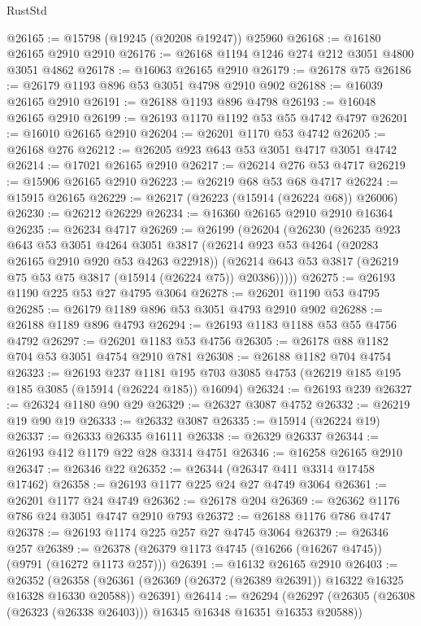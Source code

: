 \begin{lexlean}{RustStd}
\begin{coremodule}
@26165 := @15798 (@19245 (@20208 @19247)) @25960
@26168 := @16180 @26165 @2910 @2910
@26176 := @26168 @1194 @1246 @274 @212 @3051 @4800 @3051 @4862
@26178 := @16063 @26165 @2910
@26179 := @26178 @75
@26186 := @26179 @1193 @896 @53 @3051 @4798 @2910 @902
@26188 := @16039 @26165 @2910
@26191 := @26188 @1193 @896 @4798
@26193 := @16048 @26165 @2910
@26199 := @26193 @1170 @1192 @53 @55 @4742 @4797
@26201 := @16010 @26165 @2910
@26204 := @26201 @1170 @53 @4742
@26205 := @26168 @276
@26212 := @26205 @923 @643 @53 @3051 @4717 @3051 @4742
@26214 := @17021 @26165 @2910
@26217 := @26214 @276 @53 @4717
@26219 := @15906 @26165 @2910
@26223 := @26219 @68 @53 @68 @4717
@26224 := @15915 @26165
@26229 := @26217 (@26223 (@15914 (@26224 @68)) @26006)
@26230 := @26212 @26229
@26234 := @16360 @26165 @2910 @2910 @16364
@26235 := @26234 @4717
@26269 := @26199
    (@26204
      (@26230
        (@26235
          @923
          @643
          @53
          @3051
          @4264
          @3051
          @3817
          (@26214 @923 @53 @4264 (@20283 @26165 @2910 @920 @53 @4263 @22918))
          (@26214 @643 @53 @3817 (@26219 @75 @53 @75 @3817 (@15914 (@26224 @75)) @20386)))))
@26275 := @26193 @1190 @225 @53 @27 @4795 @3064
@26278 := @26201 @1190 @53 @4795
@26285 := @26179 @1189 @896 @53 @3051 @4793 @2910 @902
@26288 := @26188 @1189 @896 @4793
@26294 := @26193 @1183 @1188 @53 @55 @4756 @4792
@26297 := @26201 @1183 @53 @4756
@26305 := @26178 @88 @1182 @704 @53 @3051 @4754 @2910 @781
@26308 := @26188 @1182 @704 @4754
@26323 := @26193
    @237
    @1181
    @195
    @703
    @3085
    @4753
    (@26219 @185 @195 @185 @3085 (@15914 (@26224 @185)) @16094)
@26324 := @26193 @239
@26327 := @26324 @1180 @90 @29
@26329 := @26327 @3087 @4752
@26332 := @26219 @19 @90 @19
@26333 := @26332 @3087
@26335 := @15914 (@26224 @19)
@26337 := @26333 @26335 @16111
@26338 := @26329 @26337
@26344 := @26193 @412 @1179 @22 @28 @3314 @4751
@26346 := @16258 @26165 @2910
@26347 := @26346 @22
@26352 := @26344 (@26347 @411 @3314 @17458 @17462)
@26358 := @26193 @1177 @225 @24 @27 @4749 @3064
@26361 := @26201 @1177 @24 @4749
@26362 := @26178 @204
@26369 := @26362 @1176 @786 @24 @3051 @4747 @2910 @793
@26372 := @26188 @1176 @786 @4747
@26378 := @26193 @1174 @225 @257 @27 @4745 @3064
@26379 := @26346 @257
@26389 := @26378 (@26379 @1173 @4745 (@16266 (@16267 @4745)) (@9791 (@16272 @1173 @257)))
@26391 := @16132 @26165 @2910
@26403 := @26352
    (@26358 (@26361 (@26369 (@26372 (@26389 @26391)) @16322 @16325 @16328 @16330 @20588)) @26391)
@26414 := @26294
    (@26297 (@26305 (@26308 (@26323 (@26338 @26403))) @16345 @16348 @16351 @16353 @20588))

\end{coremodule}
\end{lexlean}
